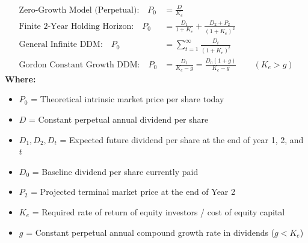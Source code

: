 \begin{formulabox}
\begin{align*}
    \text{Zero-Growth Model (Perpetual):} \quad P_0 &= \frac{D}{K_e} \\[4pt]
    \text{Finite 2-Year Holding Horizon:} \quad P_0 &= \frac{D_1}{1 + K_e} + \frac{D_2 + P_2}{(1 + K_e)^2} \\[4pt]
    \text{General Infinite DDM:} \quad P_0 &= \sum_{t=1}^{\infty} \frac{D_t}{(1 + K_e)^t} \\[4pt]
    \text{Gordon Constant Growth DDM:} \quad P_0 &= \frac{D_1}{K_e - g} = \frac{D_0 (1 + g)}{K_e - g} \qquad (K_e > g)
\end{align*}
\textbf{Where:}
\begin{itemize}[noitemsep, topsep=2pt]
    \item $P_0$ = Theoretical intrinsic market price per share today
    \item $D$ = Constant perpetual annual dividend per share
    \item $D_1, D_2, D_t$ = Expected future dividend per share at the end of year 1, 2, and $t$
    \item $D_0$ = Baseline dividend per share currently paid
    \item $P_2$ = Projected terminal market price at the end of Year 2
    \item $K_e$ = Required rate of return of equity investors / cost of equity capital
    \item $g$ = Constant perpetual annual compound growth rate in dividends ($g < K_e$)
\end{itemize}
\end{formulabox}

